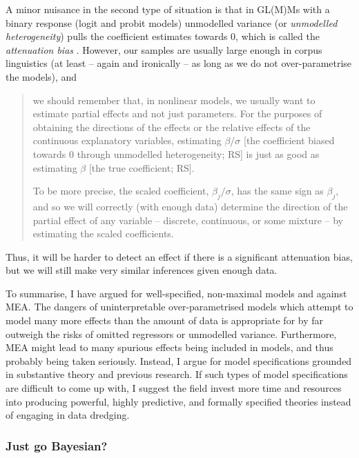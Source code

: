 A minor nuisance in the second type of situation is that in GL(M)Ms with a binary response (logit and probit models) unmodelled variance (or \textit{unmodelled heterogeneity}) pulls the coefficient estimates towards 0, which is called the \textit{attenuation bias} \citep[582--585]{Wooldrige2010}.
However, our samples are usually large enough in corpus linguistics (at least -- again and ironically -- as long as we do not over-parametrise the models), and

\begin{quote}
  we should remember that, in nonlinear models, we usually want to estimate partial effects and not just parameters.
  For the purposes of obtaining the directions of the effects or the relative effects of the continuous explanatory variables, estimating $\beta/\sigma$ [the coefficient biased towards 0 through unmodelled heterogeneity; RS] is just as good as estimating $\beta$ [the true coefficient; RS].

  To be more precise, the scaled coefficient, $\beta_j/\sigma$, has the same sign as $\beta_j$, and so we will correctly (with enough data) determine the direction of the partial effect of any variable -- discrete, continuous, or some mixture -- by estimating the scaled coefficients. \citep[583]{Wooldrige2010}
\end{quote}

Thus, it will be harder to detect an effect if there is a significant attenuation bias, but we will still make very similar inferences given enough data.

To summarise, I have argued for well-specified, non-maximal models and against MEA.
The dangers of uninterpretable over-parametrised models which attempt to model many more effects than the amount of data is appropriate for by far outweigh the risks of omitted regressors or unmodelled variance.
Furthermore, MEA might lead to many spurious effects being included in models, and thus probably being taken seriously.
Instead, I argue for model specifications grounded in substantive theory and previous research.
If such types of model specifications are difficult to come up with, I suggest the field invest more time and resources into producing powerful, highly predictive, and formally specified theories instead of engaging in data dredging.


\subsubsection{Just go Bayesian?}
\label{sec:bayesianhype}

